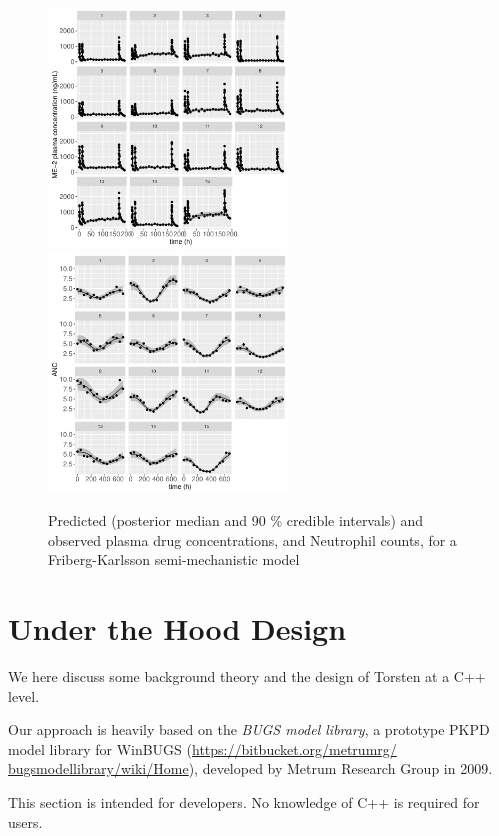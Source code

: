 \documentclass[11pt]{amsart}
\let\oldsection\section
\renewcommand\section{\clearpage\oldsection}
\begin{document}
\begin{figure}[htbp]
\includegraphics[width=2.5in,trim=0in 0in 0 0in]{graphics/neutropenia/neutropeniaPopulation1TorstenPlots010.pdf}
\includegraphics[width=2.5in,trim=0in 0in 0 0in]{graphics/neutropenia/neutropeniaPopulation1TorstenPlots011.pdf}
\caption{{Predicted (posterior median and 90 \% credible intervals) and observed plasma drug concentrations, and Neutrophil counts, for a Friberg-Karlsson semi-mechanistic model}}
\label{FKPredictions}
\end{figure}
 

 
 

\section{Under the Hood Design}
We here discuss some background theory and the design of Torsten at a C++ level.

Our approach is heavily based on the \textit{BUGS model library}, a prototype PKPD model library for WinBUGS (\url{https://bitbucket.org/metrumrg/ bugsmodellibrary/wiki/Home}), developed by Metrum Research Group in 2009.

This section is intended for developers. No knowledge of C++ is required for users.
\end{document}
